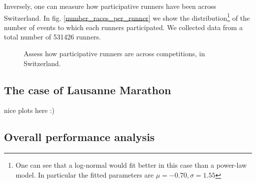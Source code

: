 \documentclass[fleqn,10pt]{wlscirep}
\begin{document}
		Inversely, one can measure how participative runners have been across Switzerland. 
		In fig. \ref{number_races_per_runner} we show the distribution\footnote{		One can see that a log-normal would fit better in this case than a power-law model. In particular the fitted parameters are $ \mu = -0.70, \sigma  = 1.55 $} of  the number of events to which each runners participated. We collected data from  a total number of 531426 runners.

		
		
		\begin{figure}[h]	
			
			\centering
			
			
			\caption{Assess how participative runners are across competitions, in Switzerland.}
			
			
		\end{figure}					
			
	\subsection*{The case of Lausanne Marathon}
		
	nice plots here :) 

	\subsection*{Overall performance analysis}
	
\end{document}
